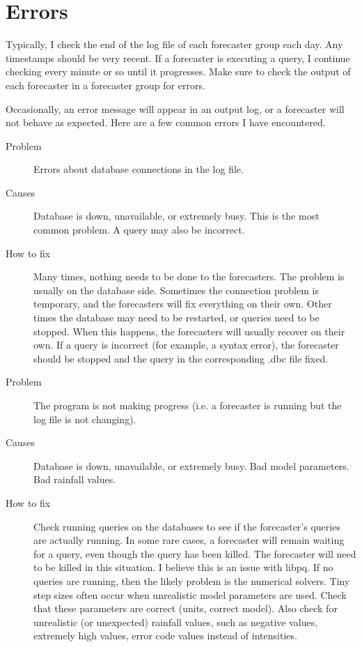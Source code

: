 \documentclass[12pt]{article}
\begin{document}
\section{Errors} \label{sec: errors}

Typically, I check the end of the log file of each forecaster group each day. Any timestamps should be very recent. If a forecaster is executing a query, I continue checking every minute or so until it progresses. Make sure to check the output of each forecaster in a forecaster group for errors.

Occasionally, an error message will appear in an output log, or a forecaster will not behave as expected. Here are a few common errors I have encountered.

\begin{description}
 \item[Problem] Errors about database connections in the log file.
 \item[Causes] Database is down, unavailable, or extremely busy. This is the most common problem. A query may also be incorrect.
 \item[How to fix] Many times, nothing needs to be done to the forecasters. The problem is usually on the database side. Sometimes the connection problem is temporary, and the forecasters will fix everything on their own. Other times the database may need to be restarted, or queries 
need to be stopped. When this happens, the forecasters will usually recover on their own. If a query is incorrect (for example, a syntax error), the forecaster should be stopped and the query in the corresponding .dbc file fixed.
\end{description}

\vspace{.1in}
\begin{description}
 \item[Problem] The program is not making progress (i.e. a forecaster is running but the log file is not changing).
 \item[Causes] Database is down, unavailable, or extremely busy. Bad model parameters. Bad rainfall values.
 \item[How to fix] Check running queries on the databases to see if the forecaster's queries are actually running. In some rare cases, a forecaster will remain waiting for a query, even though the query has been killed. The forecaster will need to be killed in this situation. I believe this is an issue with libpq. If no queries are running, then the likely problem is the numerical solvers. Tiny step sizes often occur when unrealistic model parameters are used. Check that these parameters are correct (units, correct model). Also check for unrealistic (or unexpected) rainfall values, such as negative values, extremely high values, error code values instead of intensities.
\end{description}
\end{document}
